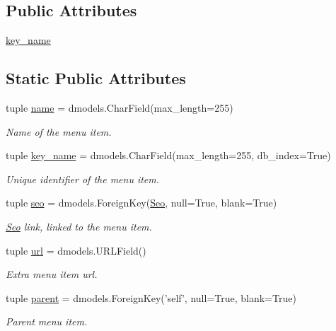 \subsection*{Public Attributes}
\begin{DoxyCompactItemize}
\item 
\hyperlink{classcore_1_1models_1_1MenuItem_a6eccff1165c95be4b9c0efee213e3878}{key\-\_\-name}
\end{DoxyCompactItemize}
\subsection*{Static Public Attributes}
\begin{DoxyCompactItemize}
\item 
tuple \hyperlink{classcore_1_1models_1_1MenuItem_ab3946f967b3a1fce02d39c5ecb2185f5}{name} = dmodels.\-Char\-Field(max\-\_\-length=255)
\begin{DoxyCompactList}\small\item\em Name of the menu item. \end{DoxyCompactList}\item 
tuple \hyperlink{classcore_1_1models_1_1MenuItem_a6eccff1165c95be4b9c0efee213e3878}{key\-\_\-name} = dmodels.\-Char\-Field(max\-\_\-length=255, db\-\_\-index=True)
\begin{DoxyCompactList}\small\item\em Unique identifier of the menu item. \end{DoxyCompactList}\item 
tuple \hyperlink{classcore_1_1models_1_1MenuItem_a0ed621cf4f336eee94ee6af73f138add}{seo} = dmodels.\-Foreign\-Key(\hyperlink{classcore_1_1models_1_1Seo}{Seo}, null=True, blank=True)
\begin{DoxyCompactList}\small\item\em \hyperlink{classcore_1_1models_1_1Seo}{Seo} link, linked to the menu item. \end{DoxyCompactList}\item 
tuple \hyperlink{classcore_1_1models_1_1MenuItem_a05a0b2b1302e5a8e224ae29a4edbe93b}{url} = dmodels.\-U\-R\-L\-Field()
\begin{DoxyCompactList}\small\item\em Extra menu item url. \end{DoxyCompactList}\item 
tuple \hyperlink{classcore_1_1models_1_1MenuItem_ac284a37490aad36640bd848f29466232}{parent} = dmodels.\-Foreign\-Key('self', null=True, blank=True)
\begin{DoxyCompactList}\small\item\em Parent menu item. \end{DoxyCompactList}\item 

\end{DoxyCompactItemize}
